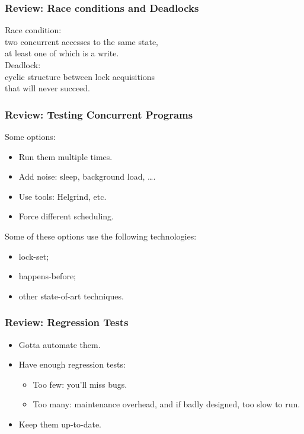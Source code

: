 \documentclass{beamer}
\newenvironment{changemargin}[1]{%
  \begin{list}{}{%
    \setlength{\topsep}{0pt}%
    \setlength{\leftmargin}{#1}%
    \setlength{\rightmargin}{1em}
    \setlength{\listparindent}{\parindent}%
    \setlength{\itemindent}{\parindent}%
    \setlength{\parsep}{\parskip}%
  }%
  \item[]}{\end{list}}
\begin{document}
\begin{frame}
  \frametitle{Review: Race conditions and Deadlocks}
  \begin{changemargin}{2cm}
Race condition: \\
two concurrent
accesses to the same state, \\
at least one of
which is a write.\\[1em] 

Deadlock: \\ 
cyclic structure between lock acquisitions\\
 that 
will never succeed.
  \end{changemargin}
\end{frame}

\begin{frame}
  \frametitle{Review: Testing Concurrent Programs}
  \begin{changemargin}{2cm}
Some options:
\begin{itemize}
\item Run them multiple times.
\item Add noise: sleep, background load, \ldots.
\item Use tools: Helgrind, etc.
\item Force different scheduling.
\end{itemize}

Some of these options use the following technologies:
\begin{itemize}
\item lock-set;
\item happens-before;
\item other state-of-art techniques.
\end{itemize}
  \end{changemargin}
\end{frame}

\begin{frame}
  \frametitle{Review: Regression Tests}
  \begin{changemargin}{2cm}
\large
\begin{itemize}
\item Gotta automate them.
\item Have enough regression tests:
\begin{itemize}
\item Too few: you'll miss bugs.
\item Too many: maintenance overhead, and if badly designed, too slow to run.
\end{itemize}
\item Keep them up-to-date.
\end{itemize}
  \end{changemargin}
\end{frame}
\end{document}
